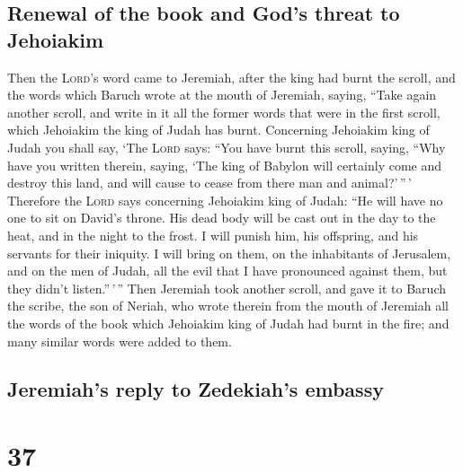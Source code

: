 \hypertarget{renewal-of-the-book-and-gods-threat-to-jehoiakim}{%
\subsection{Renewal of the book and God's threat to
Jehoiakim}\label{renewal-of-the-book-and-gods-threat-to-jehoiakim}}

 Then the \textsc{Lord}'s word came to Jeremiah, after
the king had burnt the scroll, and the words which Baruch wrote at the
mouth of Jeremiah, saying,  ``Take again another scroll,
and write in it all the former words that were in the first scroll,
which Jehoiakim the king of Judah has burnt.  Concerning
Jehoiakim king of Judah you shall say, `The \textsc{Lord} says: ``You
have burnt this scroll, saying, ``Why have you written therein, saying,
`The king of Babylon will certainly come and destroy this land, and will
cause to cease from there man and animal?'\,''\,' 
Therefore the \textsc{Lord} says concerning Jehoiakim king of Judah:
``He will have no one to sit on David's throne. His dead body will be
cast out in the day to the heat, and in the night to the frost.
 I will punish him, his offspring, and his servants for
their iniquity. I will bring on them, on the inhabitants of Jerusalem,
and on the men of Judah, all the evil that I have pronounced against
them, but they didn't listen.''\,'\,''  Then Jeremiah
took another scroll, and gave it to Baruch the scribe, the son of
Neriah, who wrote therein from the mouth of Jeremiah all the words of
the book which Jehoiakim king of Judah had burnt in the fire; and many
similar words were added to them.

\hypertarget{jeremiahs-reply-to-zedekiahs-embassy}{%
\subsection{Jeremiah's reply to Zedekiah's
embassy}\label{jeremiahs-reply-to-zedekiahs-embassy}}

\hypertarget{section-36}{%
\section{37}\label{section-36}}

